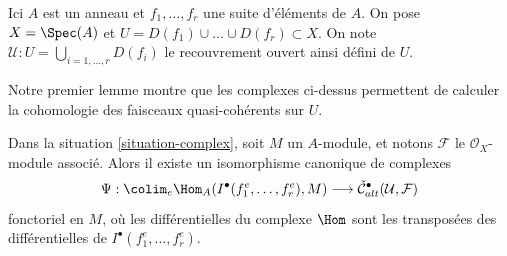 \begin{situation}
\label{situation-complex}
Ici $A$ est un anneau et $f_1, \ldots, f_r$ une suite d'éléments de $A$.
On pose $X = \Spec(A)$ et $U = D(f_1) \cup \ldots \cup D(f_r) \subset X$.
On note $\mathcal{U} : U = \bigcup_{i = 1, \ldots, r} D(f_i)$ le
recouvrement ouvert ainsi défini de $U$.
\end{situation}

\noindent
Notre premier lemme montre que les complexes ci-dessus permettent de calculer
la cohomologie des faisceaux quasi-cohérents sur $U$.

\begin{lemma}
\label{lemma-alternating-cech-complex}
Dans la situation \ref{situation-complex}, soit $M$ un $A$-module, et
notons $\mathcal{F}$ le $\mathcal{O}_X$-module associé. Alors
il existe un isomorphisme canonique de complexes
$$
\Psi : \colim_e \Hom_A(I^\bullet(f_1^e, \ldots, f_r^e), M)
\longrightarrow
\check{\mathcal{C}}_{alt}^\bullet(\mathcal{U}, \mathcal{F})
$$
fonctoriel en $M$, où les différentielles du complexe $\Hom$
sont les transposées des différentielles de
$I^\bullet(f_1^e, \ldots, f_r^e)$.
\end{lemma}

